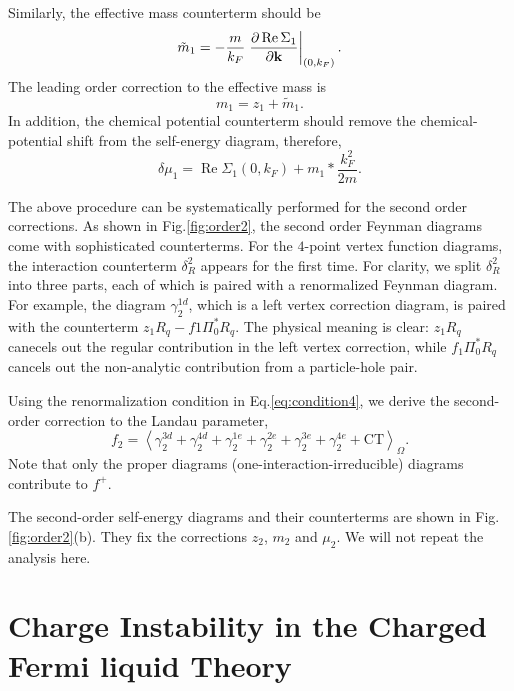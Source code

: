 \documentclass[reprint,amsmath,amssymb,aps,prb]{revtex4-1}
\begin{document}
Similarly, the effective mass counterterm should be
\begin{equation}
    \tilde{m}_1 = -\frac{m}{k_F}\left. \frac{\partial \operatorname{Re} \Sigma_1}{\partial \bold{k}} \right|_{(0, k_F)}.
\end{equation}
The leading order correction to the effective mass is
\begin{equation}
    m_1 = z_1+\tilde{m}_1.
\end{equation}
In addition, the chemical potential counterterm should remove the chemical-potential shift from the self-energy diagram, therefore,
\begin{equation}
    \delta \mu_1 = \operatorname{Re} \Sigma_1(0, k_F)+m_1*\frac{k_F^2}{2m}.
\end{equation}

The above procedure can be systematically performed for the second order corrections.
As shown in Fig.\ref{fig:order2}, the second order Feynman diagrams come with sophisticated counterterms.
For the $4$-point vertex function diagrams, the interaction counterterm $\delta_R^2$ appears for the first time.
For clarity, we split $\delta_R^2$ into three parts, each of which is paired with a renormalized Feynman diagram.
For example, the diagram $\gamma_2^{1d}$, which is a left vertex correction diagram, is paired with the counterterm $z_1R_q-f1\Pi^*_0R_q$.
The physical meaning is clear: $z_1 R_q$ canecels out the regular contribution in the left vertex correction,
while $f_1\Pi_0^*R_q$ cancels out the non-analytic contribution from a particle-hole pair.

Using the renormalization condition in Eq.\eqref{eq:condition4}, we derive the second-order correction to the Landau parameter,
\begin{equation}
    f_2 = \left<\gamma_2^{3d}+\gamma_2^{4d}+\gamma_2^{1e}+\gamma_2^{2e}+\gamma_2^{3e}+\gamma_2^{4e} + \text{CT}\right>_\Omega.
\end{equation}
Note that only the proper diagrams (one-interaction-irreducible) diagrams contribute to $f^+$.

The second-order self-energy diagrams and their counterterms are shown in Fig.\ref{fig:order2}(b).
They fix the corrections $z_2$, $m_2$ and $\mu_2$. We will not repeat the analysis here.

\section{Charge Instability in the Charged Fermi liquid Theory}
\end{document}
